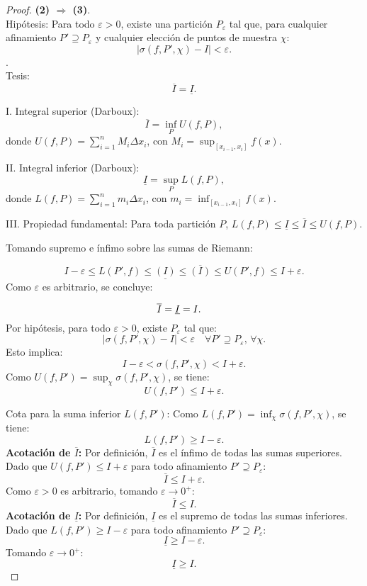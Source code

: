 \documentclass{article}
\begin{document}
	\begin{proof}\textbf{(2) \(\Rightarrow\) (3)}.\\
	Hipótesis: 
	Para todo \( \varepsilon > 0 \), existe una partición \( P_\varepsilon \) tal que, para cualquier afinamiento \( P' \supseteq P_\varepsilon \) y cualquier elección de puntos de muestra \( \chi \):  
	\[
	|\sigma(f, P', \chi) - I| < \varepsilon.
	\].\\
	Tesis: 
	\[
	\overline{I} = \underline{I}.
	\]
	
	I. Integral superior (Darboux):
	\[
	\overline{I} = \inf_{P} U(f, P),
	\]  
	donde \( U(f, P) = \sum_{i=1}^n M_i \Delta x_i \), con \( M_i = \sup_{[x_{i-1}, x_i]} f(x) \).  
	
	II. Integral inferior (Darboux): 
	\[
	\underline{I} = \sup_{P} L(f, P),
	\]  
	donde \( L(f, P) = \sum_{i=1}^n m_i \Delta x_i \), con \( m_i = \inf_{[x_{i-1}, x_i]} f(x) \).  
	
	III. Propiedad fundamental:  
	Para toda partición \( P \), \( L(f, P) \leq \underline{I} \leq \overline{I} \leq U(f, P) \).  
			
	Tomando supremo e ínfimo sobre las sumas de Riemann:
		
		
		\[
		I - \varepsilon \leq L(P', f) \leq \underline{(I)}  \leq \overline{(I)}  \leq U(P', f) \leq I + \varepsilon.
		\]			
	Como \( \varepsilon \) es arbitrario, se concluye:
		
		
		\[
		\overline{I} = \underline{I} = I. \quad \qedhere
		\]
	Por hipótesis, para todo \( \varepsilon > 0 \), existe \( P_\varepsilon \) tal que:  
		\[
		|\sigma(f, P', \chi) - I| < \varepsilon \quad \forall P' \supseteq P_\varepsilon, \, \forall \chi.
		\]  
	Esto implica:  
		\[
		I - \varepsilon < \sigma(f, P', \chi) < I + \varepsilon.
		\]  
	Como \( U(f, P') = \sup_{\chi} \sigma(f, P', \chi) \), se tiene:  
		\[
		U(f, P') \leq I + \varepsilon.
		\]  
		
	Cota para la suma inferior \( L(f, P') \):
	Como \( L(f, P') = \inf_{\chi} \sigma(f, P', \chi) \), se tiene:  
		\[
		L(f, P') \geq I - \varepsilon.
		\]  
		\textbf{Acotación de \( \overline{I} \):}
		Por definición, \( \overline{I} \) es el ínfimo de todas las sumas superiores. Dado que \( U(f, P') \leq I + \varepsilon \) para todo afinamiento \( P' \supseteq P_\varepsilon \):  
		\[
		\overline{I} \leq I + \varepsilon.
		\]  
		Como \( \varepsilon > 0 \) es arbitrario, tomando \( \varepsilon \to 0^+ \):  
		\[
		\overline{I} \leq I.
		\]  
		\textbf{Acotación de \( \underline{I} \):}
		Por definición, \( \underline{I} \) es el supremo de todas las sumas inferiores. Dado que \( L(f, P') \geq I - \varepsilon \) para todo afinamiento \( P' \supseteq P_\varepsilon \):  
		\[
		\underline{I} \geq I - \varepsilon.
		\]  
		Tomando \( \varepsilon \to 0^+ \):  
		\[
		\underline{I} \geq I.
		\]  
		

\end{proof}
\end{document}
